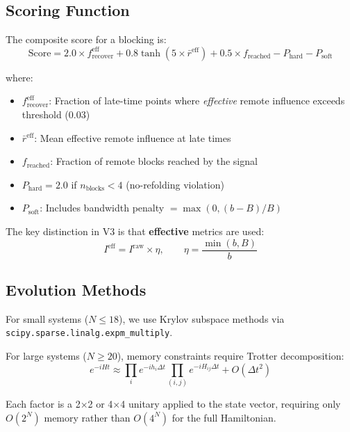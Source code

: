 \documentclass[11pt]{article}
\begin{document}
\subsection{Scoring Function}

The composite score for a blocking is:
\begin{equation}
    \text{Score} = 2.0 \times f_{\text{recover}}^{\text{eff}} 
    + 0.8 \tanh(5 \times \bar{r}^{\text{eff}})
    + 0.5 \times f_{\text{reached}}
    - P_{\text{hard}} - P_{\text{soft}}
\end{equation}

where:
\begin{itemize}
    \item $f_{\text{recover}}^{\text{eff}}$: Fraction of late-time points where 
    \emph{effective} remote influence exceeds threshold (0.03)
    \item $\bar{r}^{\text{eff}}$: Mean effective remote influence at late times
    \item $f_{\text{reached}}$: Fraction of remote blocks reached by the signal
    \item $P_{\text{hard}} = 2.0$ if $n_{\text{blocks}} < 4$ (no-refolding violation)
    \item $P_{\text{soft}}$: Includes bandwidth penalty $= \max(0, (b-B)/B)$
\end{itemize}

The key distinction in V3 is that \textbf{effective} metrics are used:
\begin{equation}
    I^{\text{eff}} = I^{\text{raw}} \times \eta, \qquad \eta = \frac{\min(b, B)}{b}
\end{equation}

\subsection{Evolution Methods}

For small systems ($N \leq 18$), we use Krylov subspace methods via 
\texttt{scipy.sparse.linalg.expm\_multiply}.

For large systems ($N \geq 20$), memory constraints require Trotter decomposition:
\begin{equation}
    e^{-iHt} \approx \prod_i e^{-i h_i \Delta t} \prod_{(i,j)} e^{-i H_{ij} \Delta t} + O(\Delta t^2)
\end{equation}

Each factor is a 2$\times$2 or 4$\times$4 unitary applied to the state vector, requiring only 
$O(2^N)$ memory rather than $O(4^N)$ for the full Hamiltonian.
\end{document}
